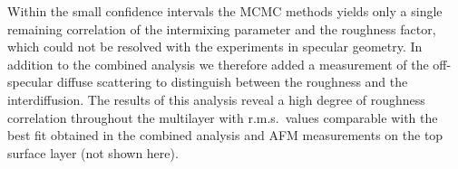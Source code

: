 \documentclass{iucr}              %
\begin{document}
Within the small confidence intervals the MCMC methods yields only a single remaining correlation of the intermixing parameter and the roughness factor, which could not be resolved with the experiments in specular geometry. In addition to the combined analysis we therefore added a measurement of the off-specular diffuse scattering to distinguish between the roughness and the interdiffusion. The results of this analysis reveal a high degree of roughness correlation throughout the multilayer with r.m.s.~values comparable with the best fit obtained in the combined analysis and AFM measurements on the top surface layer (not shown here).








\end{document}
